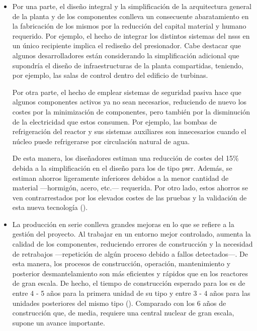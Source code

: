 \begin{itemize}
  \item Por una parte, el diseño integral y la simplificación de la arquitectura general de la planta y de los componentes conlleva un consecuente abaratamiento en la fabricación de los mismos por la reducción del capital material y humano requerido. Por ejemplo, el hecho de integrar los distintos sistemas del \acrshort{nsss} en un único recipiente implica el rediseño del presionador. Cabe destacar que algunos desarrolladores están considerando la simplificación adicional que supondría el diseño de infraestructuras de la planta compartidas, teniendo, por ejemplo, las salas de control dentro del edificio de turbinas.
  
  Por otra parte, el hecho de emplear sistemas de seguridad pasiva hace que algunos componentes activos ya no sean necesarios, reduciendo de nuevo los costes por la minimización de componentes, pero también por la disminución de la electricidad que estos consumen. Por ejemplo, las bombas de refrigeración del reactor y sus sistemas auxiliares son innecesarios cuando el núcleo puede refrigerarse por circulación natural de agua. 
  
  De esta manera, los diseñadores estiman una reducción de costes del 15\% debida a la simplificación en el diseño para los  de tipo \acrshort{pwr}. Además, se estiman ahorros ligeramente inferiores debidos a la menor cantidad de material ---hormigón, acero, etc.--- requerida. Por otro lado, estos ahorros se ven contrarrestados por los elevados costes de las pruebas y la validación de esta nueva tecnología (\cite{nea_market_potential}).

  \item La producción en serie conlleva grandes mejoras en lo que se refiere a la gestión del proyecto. Al trabajar en un entorno mejor controlado, aumenta la calidad de los componentes, reduciendo errores de construcción y la necesidad de retrabajos ---repetición de algún proceso debido a fallos detectados---. De esta manera, los procesos de construcción, operación, mantenimiento y posterior desmantelamiento son más eficientes y rápidos que en los reactores de gran escala. De hecho, el tiempo de construcción esperado para los  es de entre 4 - 5 años para la primera unidad de su tipo y entre 3 - 4 años para las unidades posteriores del mismo tipo (\cite{VEGEL2017395}). Comparado con los 6 años de construcción que, de media, requiere una central nuclear de gran escala, supone un avance importante. 
  

\end{itemize}
